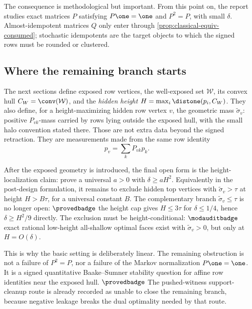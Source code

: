 The consequence is methodological but important.  From this point on,
the report studies exact matrices \(P\) satisfying \(P\one=\one\) and
\(P^2=P\), with small \(\delta\).  Almost-idempotent matrices \(Q\) only
enter through \cref{prop:classical-equiv-consumed}; stochastic
idempotents are the target objects to which the signed rows must be
rounded or clustered.

\subsection{Where the remaining branch starts}

The next sections define exposed row vertices, the well-exposed set
\(\mathcal W\), its convex hull \(C_W=\conv(\mathcal W)\), and the
\emph{hidden height} \(H=\max_i\distone(p_i,C_W)\).  They also define,
for a height-maximizing hidden row vertex \(v\), the geometric mass
\(\widetilde\sigma_v\): positive \(P_{vk}\)-mass carried by rows lying
outside the exposed hull, with the small halo convention stated there.
Those are not extra data beyond the signed retraction.  They are
measurements made from the same row identity
\[
  p_v=\sum_k P_{vk}p_k.
\]

\begin{openproblem}
\openbadge
\label{op:residual-branch-preview}
After the exposed geometry is introduced, the final open form is the
height-localization claim: prove a universal \(a>0\) with
\(\delta\ge aH^2\).  Equivalently in the post-design formulation, it
remains to exclude hidden top vertices with
\(\widetilde\sigma_v>\tau\) at height \(H>B\tau\), for a universal
constant \(B\).  The complementary branch
\(\widetilde\sigma_v\le\tau\) is no longer open:
\(\provedbadge\) the height cap gives \(H\le 3\tau\) for
\(\delta\le 1/4\), hence \(\delta\ge H^2/9\) directly.  The exclusion
must be height-conditional:
\(\modauditbadge\) exact rational low-height all-shallow optimal faces
exist with \(\widetilde\sigma_v>0\), but only at \(H=O(\delta)\).
\end{openproblem}

This is why the basic setting is deliberately linear.  The remaining
obstruction is not a failure of \(P^2=P\), nor a failure of the Markov
normalization \(P\one=\one\).  It is a signed quantitative
Baake--Sumner stability question for affine row identities near the
exposed hull.  \(\provedbadge\) The pushed-witness support-cleanup route
is already recorded as unable to close the remaining branch, because
negative leakage breaks the dual optimality needed by that route.
